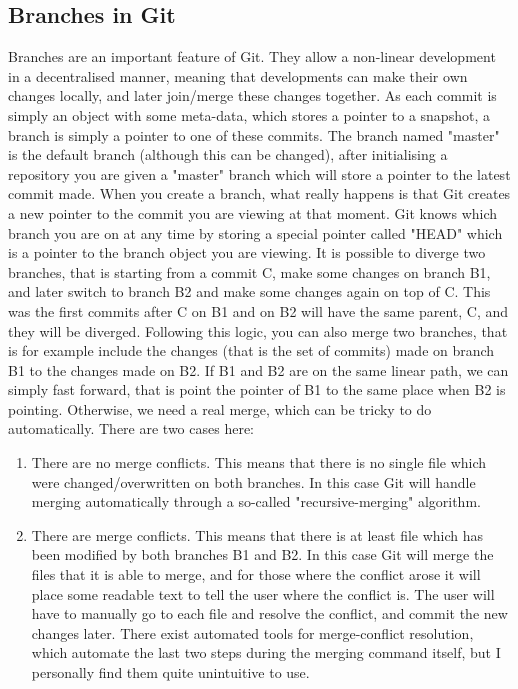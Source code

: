 \documentclass[12pt,twoside,notitlepage]{report}
\begin{document}
\subsection{Branches in Git}\label{gitbranches}
Branches are an important feature of Git. They allow a non-linear development in a decentralised manner, meaning that developments can make their own changes locally, and later join/merge these changes together. As each commit is simply an object with some meta-data, which stores a pointer to a snapshot, a branch is simply a pointer to one of these commits. The branch named "master" is the default branch (although this can be changed), after initialising a repository you are given a "master" branch which will store a pointer to the latest commit made. When you create a branch, what really happens is that Git creates a new pointer to the commit you are viewing at that moment. Git knows which branch you are on at any time by storing a special pointer called "HEAD" which is a pointer to the branch object you are viewing. It is possible to diverge two branches, that is starting from a commit C, make some changes on branch B1, and later switch to branch B2 and make some changes again on top of C. This was the first commits after C on B1 and on B2 will have the same parent, C, and they will be diverged. Following this logic, you can also merge two branches, that is for example include the changes (that is the set of commits) made on branch B1 to the changes made on B2. If B1 and B2 are on the same linear path, we can simply fast forward, that is point the pointer of B1 to the same place when B2 is pointing. Otherwise, we need a real merge, which can be tricky to do automatically. There are two cases here:
\begin{enumerate}
\item There are no merge conflicts. This means that there is no single file which were changed/overwritten on both branches. In this case Git will handle merging automatically through a so-called "recursive-merging" algorithm.
\item There are merge conflicts. This means that there is at least file which has been modified by both branches B1 and B2. In this case Git will merge the files that it is able to merge, and for those where the conflict arose it will place some readable text to tell the user where the conflict is. The user will have to manually go to each file and resolve the conflict, and commit the new changes later. There exist automated tools for merge-conflict resolution, which automate the last two steps during the merging command itself, but I personally find them quite unintuitive to use.
\end{enumerate}
\end{document}
